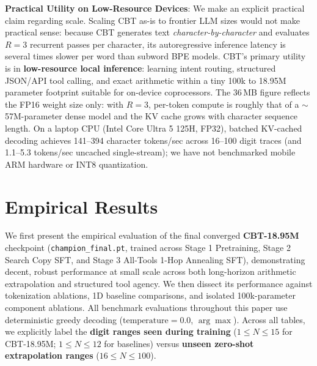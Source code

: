 \documentclass[10pt,twocolumn]{article}
\begin{document}
\textbf{Practical Utility on Low-Resource Devices}: We make an explicit practical claim regarding scale. Scaling CBT as-is to frontier LLM sizes would not make practical sense: because CBT generates text \emph{character-by-character} and evaluates $R=3$ recurrent passes per character, its autoregressive inference latency is several times slower per word than subword BPE models. CBT's primary utility is in \textbf{low-resource local inference}: learning intent routing, structured JSON/API tool calling, and exact arithmetic within a tiny 100k to 18.95M parameter footprint suitable for on-device coprocessors. The 36\,MB figure reflects the FP16 weight size only: with $R=3$, per-token compute is roughly that of a $\sim$57M-parameter dense model and the KV cache grows with character sequence length. On a laptop CPU (Intel Core Ultra 5 125H, FP32), batched KV-cached decoding achieves 141--394 character tokens/sec across 16--100 digit traces (and 1.1--5.3 tokens/sec uncached single-stream); we have not benchmarked mobile ARM hardware or INT8 quantization.

\section{Empirical Results}
\label{sec:empirical_results}

We first present the empirical evaluation of the final converged \textbf{CBT-18.95M} checkpoint (\texttt{champion\_final.pt}, trained across Stage 1 Pretraining, Stage 2 Search Copy SFT, and Stage 3 All-Tools 1-Hop Annealing SFT), demonstrating decent, robust performance at small scale across both long-horizon arithmetic extrapolation and structured tool agency. We then dissect its performance against tokenization ablations, 1D baseline comparisons, and isolated 100k-parameter component ablations. All benchmark evaluations throughout this paper use deterministic greedy decoding ($\text{temperature}=0.0$, $\arg\max$). Across all tables, we explicitly label the \textbf{digit ranges seen during training} ($1 \le N \le 15$ for CBT-18.95M; $1 \le N \le 12$ for baselines) versus \textbf{unseen zero-shot extrapolation ranges} ($16 \le N \le 100$).
\end{document}
